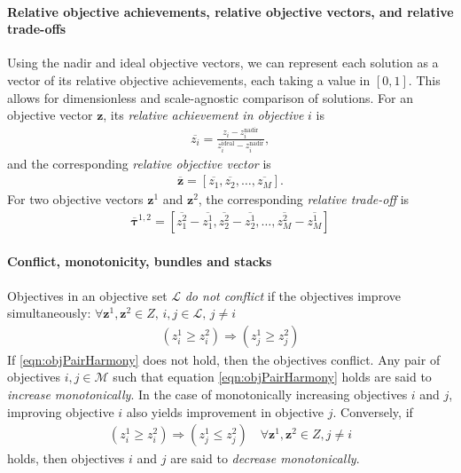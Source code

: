 \paragraph{Relative objective achievements, relative objective vectors, and relative trade-offs}
Using the nadir and ideal objective vectors, we can represent each solution as a vector of its relative objective achievements, each taking a value in $[0,1]$. This allows for dimensionless and scale-agnostic comparison of solutions. For an objective vector $\mathbf{z}$, its \textit{relative achievement in objective} $i$ is
\begin{align}
\overbar{z_i} = \frac{z_i - z^\text{nadir}_i}{z^\text{ideal}_i - z^\text{nadir}_i},
\end{align}
and the corresponding \textit{relative objective vector} is
\begin{align}
\overbar{\mathbf{z}} = [\overbar{z_1},\overbar{z_2},\ldots,\overbar{z_M}].
\end{align}
For two objective vectors $\mathbf{z}^1$ and $\mathbf{z}^2$, the corresponding \textit{relative trade-off} is
\begin{align}
\overbar{\mathbf{\tau}}^{1,2} = \left[\overbar{z^2_1} - \overbar{z^1_1}, \overbar{z^2_2} - \overbar{z^1_2}, \ldots, \overbar{z^2_M} - \overbar{z^1_M}\right]
\end{align}

\paragraph{Conflict, monotonicity, bundles and stacks}
Objectives in an objective set $\mathcal{L}$ \textit{do not conflict} if the objectives improve simultaneously:
$\forall \mathbf{z}^1, \mathbf{z}^2 \in Z,\, i,j \in \mathcal{L}, \, j \neq i$
\begin{align}
(z^1_i \ge z^2_i) \Rightarrow (z^1_j \ge z^2_j)\label{eqn:objPairHarmony}
\end{align}
If \eqref{eqn:objPairHarmony} does not hold, then the objectives conflict. Any pair of objectives $i,j \in \mathcal{M}$ such that equation \eqref{eqn:objPairHarmony} holds are said to \textit{increase monotonically}. In the case of monotonically increasing objectives $i$ and $j$, improving objective $i$ also yields improvement in objective $j$. Conversely, if 
\begin{align}
(z^1_i \ge z^2_i) \Rightarrow (z^1_j \le z^2_j) \quad \forall \mathbf{z}^1, \mathbf{z}^2 \in Z, j \neq i \label{eqn:objPairMonoDec}
\end{align}
holds, then objectives $i$ and $j$ are said to \textit{decrease monotonically}.

